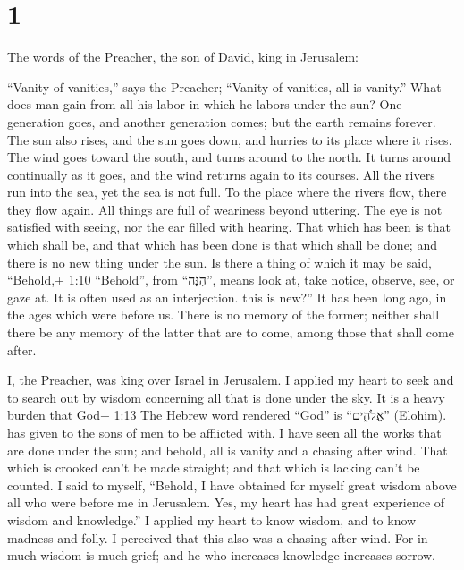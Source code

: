 \hypertarget{section}{%
\section{1}\label{section}}

 The words of the Preacher, the son of David, king in
Jerusalem:

 ``Vanity of vanities,'' says the Preacher; ``Vanity of
vanities, all is vanity.''  What does man gain from all his
labor in which he labors under the sun?  One generation
goes, and another generation comes; but the earth remains forever.
 The sun also rises, and the sun goes down, and hurries to
its place where it rises.  The wind goes toward the south,
and turns around to the north. It turns around continually as it goes,
and the wind returns again to its courses.  All the rivers
run into the sea, yet the sea is not full. To the place where the rivers
flow, there they flow again.  All things are full of
weariness beyond uttering. The eye is not satisfied with seeing, nor the
ear filled with hearing.  That which has been is that which
shall be, and that which has been done is that which shall be done; and
there is no new thing under the sun.  Is there a thing of
which it may be said, ``Behold,+ 1:10 ``Behold'', from ``הִנֵּה'', means
look at, take notice, observe, see, or gaze at. It is often used as an
interjection. this is new?'' It has been long ago, in the ages which
were before us.  There is no memory of the former; neither
shall there be any memory of the latter that are to come, among those
that shall come after.

 I, the Preacher, was king over Israel in Jerusalem.
 I applied my heart to seek and to search out by wisdom
concerning all that is done under the sky. It is a heavy burden that
God+ 1:13 The Hebrew word rendered ``God'' is ``אֱלֹהִ֑ים'' (Elohim).
has given to the sons of men to be afflicted with.  I have
seen all the works that are done under the sun; and behold, all is
vanity and a chasing after wind.  That which is crooked
can't be made straight; and that which is lacking can't be counted.
 I said to myself, ``Behold, I have obtained for myself
great wisdom above all who were before me in Jerusalem. Yes, my heart
has had great experience of wisdom and knowledge.''  I
applied my heart to know wisdom, and to know madness and folly. I
perceived that this also was a chasing after wind.  For in
much wisdom is much grief; and he who increases knowledge increases
sorrow.

